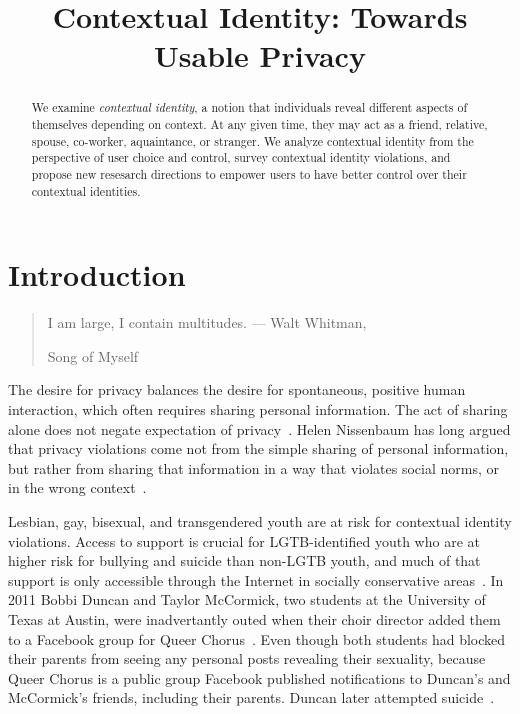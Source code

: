 \documentclass[10pt, conference, compsocconf]{IEEEtran}
\begin{document}
\title{Contextual Identity: Towards Usable Privacy}

\author{
}
\maketitle

\begin{abstract}
We examine \textit{contextual identity}, a notion that individuals reveal
different aspects of themselves depending on context. At any given time, they
may act as a friend, relative, spouse, co-worker, aquaintance, or stranger. We
analyze contextual identity from the perspective of user choice and control,
survey contextual identity violations, and propose new resesarch directions to
empower users to have better control over their contextual identities.
\end{abstract}

\section{Introduction}
\begin{quote}I am large, I contain multitudes. --- Walt Whitman,
\begin{em}Song of Myself\end{em} \end{quote}

The desire for privacy balances the desire for spontaneous, positive human
interaction, which often requires sharing personal information.  The act of
sharing alone does not negate expectation of privacy~\cite{boyd2}. Helen
Nissenbaum has long argued that privacy violations come not from the simple
sharing of personal information, but rather from sharing that information in a
way that violates social norms, or in the wrong context~\cite{nissenbaum}.

Lesbian, gay, bisexual, and transgendered youth are at risk for contextual
identity violations.  Access to support is crucial for LGTB-identified youth
who are at higher risk for bullying and suicide than non-LGTB youth, and much
of that support is only accessible through the Internet in socially
conservative areas~\cite{hrc}. In 2011 Bobbi Duncan and Taylor McCormick, two
students at the University of Texas at Austin, were inadvertantly outed when
their choir director added them to a Facebook group for Queer
Chorus~\cite{fowler}. Even though both students had blocked their parents from
seeing any personal posts revealing their sexuality, because Queer Chorus is a
public group Facebook published notifications to Duncan's and McCormick's
friends, including their parents. Duncan later attempted suicide~\cite{duncan}.
\end{document}
